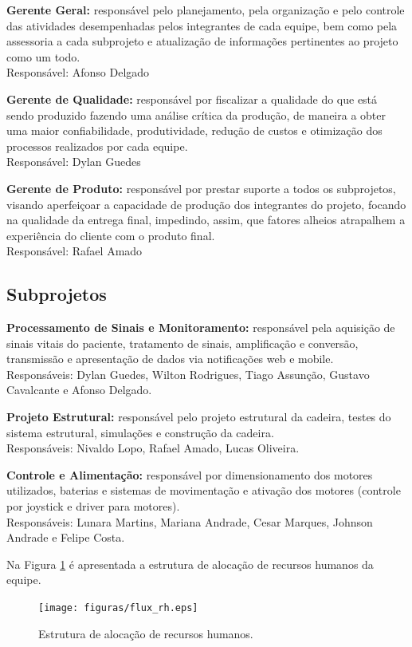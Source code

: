 \textbf{Gerente Geral:} responsável pelo planejamento, pela organização e pelo controle das atividades desempenhadas pelos integrantes de cada equipe, bem como pela assessoria a cada subprojeto e atualização de informações pertinentes ao projeto como um todo.
\\Responsável: Afonso Delgado

\textbf{Gerente de Qualidade:} responsável por fiscalizar a qualidade do que está sendo produzido fazendo uma análise crítica da produção, de maneira a obter uma maior confiabilidade, produtividade, redução de custos e otimização dos processos realizados por cada equipe.
\\Responsável: Dylan Guedes

\textbf{Gerente de Produto:} responsável por prestar suporte a todos os subprojetos, visando aperfeiçoar a capacidade de produção dos integrantes do projeto, focando na qualidade da entrega final, impedindo, assim,  que fatores alheios atrapalhem a experiência do cliente com o produto final.
\\Responsável: Rafael Amado

\subsection{Subprojetos}

\textbf{Processamento de Sinais e Monitoramento:} responsável pela aquisição de sinais vitais do paciente,
tratamento de sinais, amplificação e conversão, transmissão e apresentação de
dados via notificações web e mobile.
\\Responsáveis: Dylan Guedes, Wilton Rodrigues, Tiago Assunção, Gustavo Cavalcante e Afonso Delgado.

\textbf{Projeto Estrutural:} responsável pelo projeto estrutural da cadeira, testes
do sistema estrutural, simulações e construção da cadeira.
\\Responsáveis: Nivaldo Lopo, Rafael Amado, Lucas Oliveira.

\textbf{Controle e Alimentação:} responsável por dimensionamento dos motores utilizados,
baterias e sistemas de movimentação e ativação dos motores (controle por
joystick e driver para motores).
\\Responsáveis: Lunara Martins, Mariana Andrade, Cesar Marques, Johnson Andrade e Felipe Costa.

Na Figura \ref{flux_rh} é apresentada a estrutura de alocação de recursos humanos da equipe.


\begin{figure}[h]
    \centering
    \label{flux_rh}
    \texttt{[image: figuras/flux\_rh.eps]}
    \caption{Estrutura de alocação de recursos humanos.}
\end{figure}

